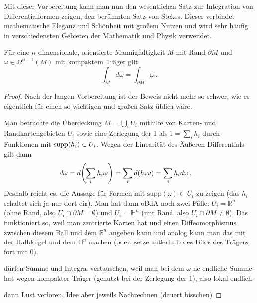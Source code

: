 \documentclass[../H_Analysis_main.tex]{subfiles}
\begin{document}
Mit dieser Vorbereitung kann man nun den wesentlichen Satz zur Integration von Differentialformen zeigen, den berühmten Satz von Stokes. Dieser verbindet mathematische Eleganz und Schönheit mit großem Nutzen und wird sehr häufig in verschiedensten Gebieten der Mathematik und Physik verwendet.

\begin{satz}[Stokes]
Für eine $n$-dimensionale, orientierte Mannigfaltigkeit $M$ mit Rand $\partial M$ und $\omega \in \Omega^{n - 1}(M)$ mit kompaktem Träger gilt
\begin{equation}
\int_M d\omega = \int_{\partial M} \omega \, .
\end{equation}
\end{satz}
\begin{proof}
Nach der langen Vorbereitung ist der Beweis nicht mehr so schwer, wie es eigentlich für einen so wichtigen und großen Satz üblich wäre.

Man betrachte die Überdeckung $M = \bigcup_i U_i$ mithilfe von Karten- und Randkartengebieten $U_i$ sowie eine Zerlegung der 1 als $1 = \sum_i h_i$ durch Funktionen mit $\text{supp}\qty(h_i) \subset U_i$. Wegen der Linearität des Äußeren Differentials gilt dann
\begin{align}
d\omega &= d\qty(\sum_i h_i \omega) = \sum_i d\qty(h_i \omega) = \sum_i h_i d\omega \, .
\end{align}
Deshalb reicht es, die Aussage für Formen mit $\text{supp}(\omega) \subset U_i$ zu zeigen (das $h_i$ schaltet sich ja nur dort ein). Man hat dann oBdA noch zwei Fälle: $U_i = \mathbb{R}^n$ (ohne Rand, also $U_i \cap \partial M = \emptyset$) und $U_i = \mathbb{H}^n$ (mit Rand, also $U_i \cap \partial M \neq \emptyset$). Das funktioniert so, weil man zentrierte Karten hat und einen Diffeomorphismus zwischen diesem Ball und dem $\mathbb{R}^n$ angeben kann und analog kann man das mit der Halbkugel und dem $\mathbb{H}^n$ machen (oder: setze außerhalb des Bilds des Trägers fort mit 0).

dürfen Summe und Integral vertauschen, weil man bei dem $\omega$ ne endliche Summe hat wegen kompakter Träger (genutzt bei der Zerlegung der 1), also lokal endlich

dann Lust verloren, Idee aber jeweils Nachrechnen (dauert bisschen)
\end{proof}

\end{document}
